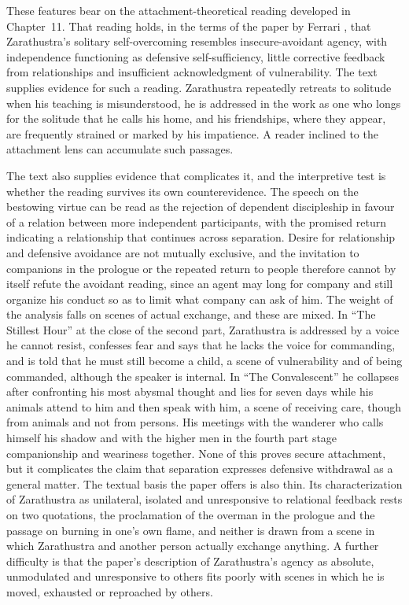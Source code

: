 These features bear on the attachment-theoretical reading developed in Chapter~11. That reading holds, in the terms of the paper by Ferrari \citep{ferrari}, that Zarathustra's solitary self-overcoming resembles insecure-avoidant agency, with independence functioning as defensive self-sufficiency, little corrective feedback from relationships and insufficient acknowledgment of vulnerability. The text supplies evidence for such a reading. Zarathustra repeatedly retreats to solitude when his teaching is misunderstood, he is addressed in the work as one who longs for the solitude that he calls his home, and his friendships, where they appear, are frequently strained or marked by his impatience. A reader inclined to the attachment lens can accumulate such passages.

The text also supplies evidence that complicates it, and the interpretive test is whether the reading survives its own counterevidence. The speech on the bestowing virtue can be read as the rejection of dependent discipleship in favour of a relation between more independent participants, with the promised return indicating a relationship that continues across separation. Desire for relationship and defensive avoidance are not mutually exclusive, and the invitation to companions in the prologue or the repeated return to people therefore cannot by itself refute the avoidant reading, since an agent may long for company and still organize his conduct so as to limit what company can ask of him. The weight of the analysis falls on scenes of actual exchange, and these are mixed. In ``The Stillest Hour'' at the close of the second part, Zarathustra is addressed by a voice he cannot resist, confesses fear and says that he lacks the voice for commanding, and is told that he must still become a child, a scene of vulnerability and of being commanded, although the speaker is internal. In ``The Convalescent'' he collapses after confronting his most abysmal thought and lies for seven days while his animals attend to him and then speak with him, a scene of receiving care, though from animals and not from persons. His meetings with the wanderer who calls himself his shadow and with the higher men in the fourth part stage companionship and weariness together. None of this proves secure attachment, but it complicates the claim that separation expresses defensive withdrawal as a general matter. The textual basis the paper offers is also thin. Its characterization of Zarathustra as unilateral, isolated and unresponsive to relational feedback rests on two quotations, the proclamation of the overman in the prologue and the passage on burning in one's own flame, and neither is drawn from a scene in which Zarathustra and another person actually exchange anything. A further difficulty is that the paper's description of Zarathustra's agency as absolute, unmodulated and unresponsive to others fits poorly with scenes in which he is moved, exhausted or reproached by others.

